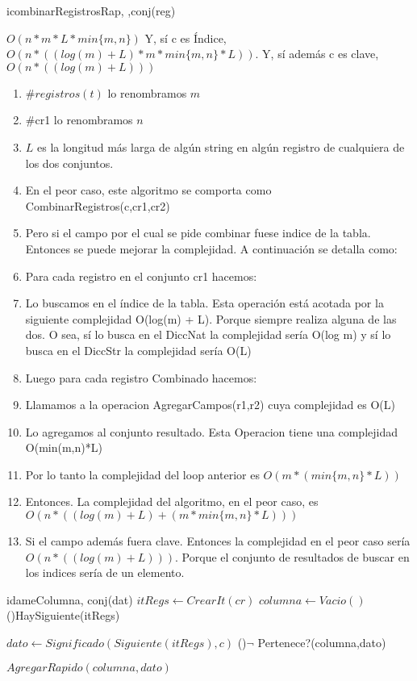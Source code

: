 \begin{Algoritmos}
\begin{algoritmo}{icombinarRegistrosRap}{, ,}{conj(reg)}
\end{algoritmo}
\datosAlgoritmo{} %
  {} %
  {} %
  {$O(n*m*L*min\lbrace m, n \rbrace)$ Y, s\'i c es \'Indice, $O(n*((log(m) + L)*m*min\lbrace m,n\rbrace*L))$. Y, s\'i adem\'as c es clave, $O(n*((log(m) + L)))$} %
  {\begin{enumerate}
	\item $\#registros(t)$ lo renombramos $m$
    \item $\#$cr1 lo renombramos $n$
    \item $L$ es la longitud m\'as larga de alg\'un string en alg\'un registro de cualquiera de los dos conjuntos.
  	\item En el peor caso, este algoritmo se comporta como CombinarRegistros(c,cr1,cr2)
    \item Pero si el campo por el cual se pide combinar fuese indice de la tabla. Entonces se puede mejorar la complejidad. A continuaci\'on se detalla como:
  	\item Para cada registro en el conjunto cr1 hacemos:
    \item Lo buscamos en el \'indice de la tabla. Esta operaci\'on est\'a acotada por la siguiente complejidad O(log(m) + L). Porque siempre realiza alguna de las dos. O sea, s\'i lo busca en el DiccNat la complejidad ser\'ia O(log m) y s\'i lo busca en el DiccStr la complejidad ser\'ia O(L)
    \item Luego para cada registro Combinado hacemos:
    \item Llamamos a la operacion AgregarCampos(r1,r2) cuya complejidad es O(L)
    \item Lo agregamos al conjunto resultado. Esta Operacion tiene una complejidad O(min(m,n)*L) 
    \item Por lo tanto la complejidad del loop anterior es $O(m*(min\lbrace m,n \rbrace*L))$
    \item Entonces. La complejidad del algoritmo, en el peor caso, es  $O(n*((log(m)+L) + (m*min\lbrace m,n \rbrace *L)))$
    \item Si el campo adem\'as fuera clave. Entonces la complejidad en el peor caso ser\'ia $O(n*((log(m)+L)))$. Porque el conjunto de resultados de buscar en los indices ser\'ia de un elemento.
    \end{enumerate} 
    } %

\begin{algoritmo}{idameColumna}{, }{conj(dat)}
    $itRegs \gets CrearIt(cr)$   	
    $columna \gets Vacio()$ 
    \While(){HaySiguiente(itRegs)}{
		$dato \gets Significado(Siguiente(itRegs), c)$ 
    	\If(){$\neg$ Pertenece?(columna,dato)}{
	        $AgregarRapido(columna, dato) $ 
    	    
}}
\end{algoritmo}
\end{Algoritmos}
